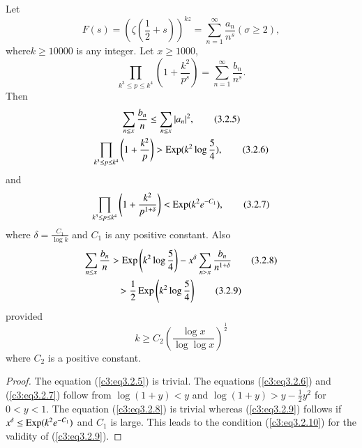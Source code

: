 \begin{sublemma}\label{c3:lem3.2.2}
Let 
\begin{equation*}
F(s) = \left(\zeta\left( \frac{1}{2} + s\right) \right)^{kz} = \sum\limits^\infty_{n=1} \frac{a_n}{n^s} (\sigma \geq 2), \tag{3.2.3}\label{c3:eq3.2.3}
\end{equation*}
where\pageoriginale $k \geq 10000$ is any integer. Let $x \geq 1000$,
\begin{equation*}
\prod\limits_{k^3 \leq p \leq k^4} \left( 1+ \frac{k^2}{p^s}\right) = \sum\limits^\infty_{n=1} \frac{b_n}{n^s}. \tag{3.2.4}\label{c3:eq3.2.4}
\end{equation*}
Then
\begin{gather*}
\sum\limits_{n \leq x} \frac{b_n}{n} \leq \sum\limits_{n \leq x} |a_n|^2, \tag{3.2.5}\label{c3:eq3.2.5}\\
\prod\limits_{k^3 \leq p \leq k^4} \left(1+\frac{k^2}{p} \right) > \operatorname{Exp} (k^2 \log \frac{5}{4}), \tag{3.2.6}\label{c3:eq3.2.6}
\end{gather*}
and
\begin{equation*}
\prod\limits_{k^3 \leq p \leq k^4} \left(1 + \frac{k^2}{p^{1+\delta}} \right) < \operatorname{Exp} (k^2 e^{-C_1}), 
\tag{3.2.7}\label{c3:eq3.2.7}
\end{equation*}
where $\delta =\frac{C_1}{\log k}$ and $C_1$ is any positive constant. Also
\begin{gather*}
\sum\limits_{n\leq x} \frac{b_n}{n}  > \operatorname{Exp} \left(k^2 \log \frac{5}{4} \right) - x^\delta \sum\limits_{n >x} \frac{b_n}{n^{1+\delta}} \tag{3.2.8}\label{c3:eq3.2.8}\\
> \frac{1}{2} \operatorname{Exp} \left(k^2 \log \frac{5}{4} \right) \tag{3.2.9}\label{c3:eq3.2.9}
\end{gather*}
provided
\begin{equation*}
k \geq C_2 \left( \frac{\log x}{\log \log x}\right)^{\frac{1}{2}} \tag{3.2.10}\label{c3:eq3.2.10}
\end{equation*}
where $C_2$ is a positive constant.
\end{sublemma}

\begin{proof}
The equation (\ref{c3:eq3.2.5}) is trivial. The equations (\ref{c3:eq3.2.6}) and (\ref{c3:eq3.2.7}) follow from $\log (1+y) <y$ and $\log (1+ y) > y -\frac{1}{2} y^2$ for $0 < y <1$. The equation (\ref{c3:eq3.2.8}) is trivial whereas (\ref{c3:eq3.2.9}) follows if $x^\delta \leq \operatorname{Exp} (k^2 e^{-C_1})$ and $C_1$ is large. This leads to the condition (\ref{c3:eq3.2.10}) for the validity of (\ref{c3:eq3.2.9}).
\end{proof}

